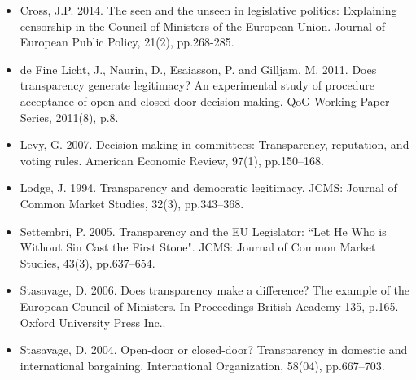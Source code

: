 \begin{itemize}
	\item Cross, J.P. 2014. The seen and the unseen in legislative politics: Explaining censorship in the Council of Ministers of the European Union. Journal of European Public Policy, 21(2), pp.268-285.
	\item de Fine Licht, J., Naurin, D., Esaiasson, P. and Gilljam, M. 2011. Does transparency generate legitimacy? An experimental study of procedure acceptance of open-and closed-door decision-making. QoG Working Paper Series, 2011(8), p.8.
	\item Levy, G. 2007. Decision making in committees: Transparency, reputation, and voting rules. American Economic Review, 97(1), pp.150–168.
	\item Lodge, J. 1994. Transparency and democratic legitimacy. JCMS: Journal of Common Market Studies, 32(3), pp.343–368.
	\item Settembri, P. 2005. Transparency and the EU Legislator: ``Let He Who is Without Sin Cast the First Stone". JCMS: Journal of Common Market Studies, 43(3), pp.637–654.
	\item Stasavage, D. 2006. Does transparency make a difference? The example of the European Council of Ministers. In Proceedings-British Academy 135, p.165. Oxford University Press Inc..
	\item Stasavage, D. 2004. Open-door or closed-door? Transparency in domestic and international bargaining. International Organization, 58(04), pp.667–703.
\end{itemize}